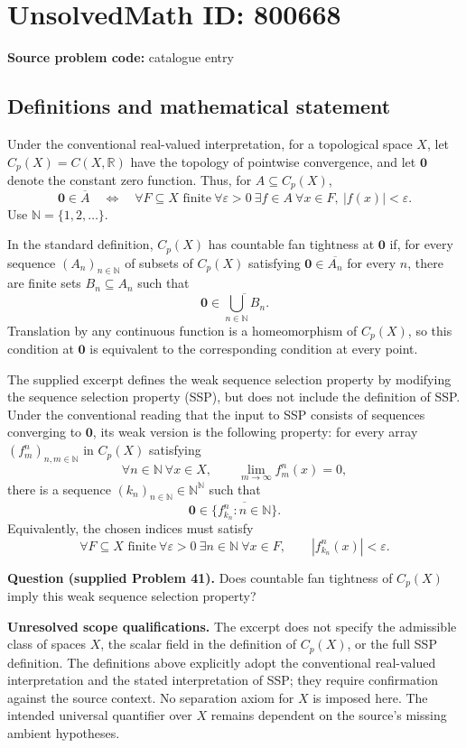 \documentclass[11pt]{article}
\newcommand{\R}{\mathbb{R}}
\begin{document}
\section*{UnsolvedMath ID: 800668}
\textbf{Source problem code:} catalogue entry
\subsection{Definitions and mathematical statement}
Under the conventional real-valued interpretation, for a topological space \(X\), let \(C_p(X)=C(X,\R)\) have the topology of pointwise convergence, and let \(\mathbf{0}\) denote the constant zero function. Thus, for \(A\subseteq C_p(X)\),
\[
\mathbf{0}\in\overline A
\quad\Longleftrightarrow\quad
\forall F\subseteq X\text{ finite}\ \forall\varepsilon>0\ \exists f\in A\ \forall x\in F,\ |f(x)|<\varepsilon.
\]
Use \(\mathbb N=\{1,2,\ldots\}\).

In the standard definition, \(C_p(X)\) has countable fan tightness at \(\mathbf{0}\) if, for every sequence \((A_n)_{n\in\mathbb N}\) of subsets of \(C_p(X)\) satisfying \(\mathbf{0}\in\overline{A_n}\) for every \(n\), there are finite sets \(B_n\subseteq A_n\) such that
\[
\mathbf{0}\in\overline{\bigcup_{n\in\mathbb N}B_n}.
\]
Translation by any continuous function is a homeomorphism of \(C_p(X)\), so this condition at \(\mathbf{0}\) is equivalent to the corresponding condition at every point.

The supplied excerpt defines the weak sequence selection property by modifying the sequence selection property (SSP), but does not include the definition of SSP. Under the conventional reading that the input to SSP consists of sequences converging to \(\mathbf{0}\), its weak version is the following property: for every array \((f^n_m)_{n,m\in\mathbb N}\) in \(C_p(X)\) satisfying
\[
\forall n\in\mathbb N\ \forall x\in X,\qquad
\lim_{m\to\infty}f^n_m(x)=0,
\]
there is a sequence \((k_n)_{n\in\mathbb N}\in\mathbb N^{\mathbb N}\) such that
\[
\mathbf{0}\in\overline{\{f^n_{k_n}:n\in\mathbb N\}}.
\]
Equivalently, the chosen indices must satisfy
\[
\forall F\subseteq X\text{ finite}\ \forall\varepsilon>0\ \exists n\in\mathbb N\ \forall x\in F,
\qquad |f^n_{k_n}(x)|<\varepsilon.
\]

\textbf{Question (supplied Problem 41).} Does countable fan tightness of \(C_p(X)\) imply this weak sequence selection property?

\textbf{Unresolved scope qualifications.} The excerpt does not specify the admissible class of spaces \(X\), the scalar field in the definition of \(C_p(X)\), or the full SSP definition. The definitions above explicitly adopt the conventional real-valued interpretation and the stated interpretation of SSP; they require confirmation against the source context. No separation axiom for \(X\) is imposed here. The intended universal quantifier over \(X\) remains dependent on the source's missing ambient hypotheses.
\end{document}
